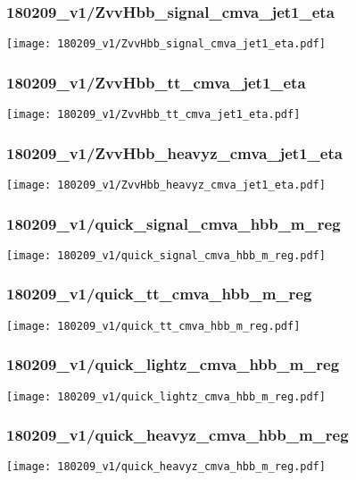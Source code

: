 \begin{frame}
   \frametitle{\small 180209\_v1/ZvvHbb\_signal\_cmva\_jet1\_eta}
   \centering
   \texttt{[image: 180209\_v1/ZvvHbb\_signal\_cmva\_jet1\_eta.pdf]}
\end{frame}

\begin{frame}
   \frametitle{\small 180209\_v1/ZvvHbb\_tt\_cmva\_jet1\_eta}
   \centering
   \texttt{[image: 180209\_v1/ZvvHbb\_tt\_cmva\_jet1\_eta.pdf]}
\end{frame}

\begin{frame}
   \frametitle{\small 180209\_v1/ZvvHbb\_heavyz\_cmva\_jet1\_eta}
   \centering
   \texttt{[image: 180209\_v1/ZvvHbb\_heavyz\_cmva\_jet1\_eta.pdf]}
\end{frame}

\begin{frame}
   \frametitle{\small 180209\_v1/quick\_signal\_cmva\_hbb\_m\_reg}
   \centering
   \texttt{[image: 180209\_v1/quick\_signal\_cmva\_hbb\_m\_reg.pdf]}
\end{frame}

\begin{frame}
   \frametitle{\small 180209\_v1/quick\_tt\_cmva\_hbb\_m\_reg}
   \centering
   \texttt{[image: 180209\_v1/quick\_tt\_cmva\_hbb\_m\_reg.pdf]}
\end{frame}

\begin{frame}
   \frametitle{\small 180209\_v1/quick\_lightz\_cmva\_hbb\_m\_reg}
   \centering
   \texttt{[image: 180209\_v1/quick\_lightz\_cmva\_hbb\_m\_reg.pdf]}
\end{frame}

\begin{frame}
   \frametitle{\small 180209\_v1/quick\_heavyz\_cmva\_hbb\_m\_reg}
   \centering
   \texttt{[image: 180209\_v1/quick\_heavyz\_cmva\_hbb\_m\_reg.pdf]}
\end{frame}


